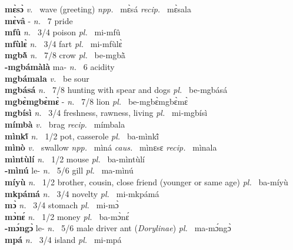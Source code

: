 {\bfseries mɛ̀sɔ̀}  {\itshape v.~} wave (greeting)   {\itshape npp.~} mɛ̀sá {\itshape recip.~} mɛ̀sala  \\ 
{\bfseries mɛ̀vâ} - {\itshape n.~} 7 pride    \\ 
{\bfseries mfû}  {\itshape n.~} 3/4 poison {\itshape pl.~} mi-mfû    \\ 
{\bfseries mfùlɛ̀}  {\itshape n.~} 3/4 fart {\itshape pl.~} mi-mfùlɛ̀    \\ 
{\bfseries mgbã̀}  {\itshape n.~} 7/8 crow {\itshape pl.~} be-mgbã̀    \\ 
{\bfseries -mgbámàlà} ma- {\itshape n.~} 6 acidity    \\ 
{\bfseries mgbámala}  {\itshape v.~} be sour    \\ 
{\bfseries mgbásá}  {\itshape n.~} 7/8 hunting with spear and dogs {\itshape pl.~} be-mgbásá    \\ 
{\bfseries mgbɛ̀mgbɛ̀mɛ̀} - {\itshape n.~} 7/8 lion  {\itshape pl.~} be-mgbɛ̀mgbɛ̀mɛ̀    \\ 
{\bfseries mgbísì}  {\itshape n.~} 3/4 freshness, rawness, living {\itshape pl.~} mi-mgbísì    \\ 
{\bfseries mímbà}  {\itshape v.~} brag   {\itshape recip.~} mímbala  \\ 
{\bfseries mìnkĩ́}  {\itshape n.~} 1/2 pot, casserole {\itshape pl.~} ba-mìnkĩ́    \\ 
{\bfseries mìnò}  {\itshape v.~} swallow   {\itshape npp.~} mìná {\itshape caus.~} mìnɛsɛ {\itshape recip.~} mìnala  \\ 
{\bfseries mìntùlí}  {\itshape n.~} 1/2 mouse {\itshape pl.~} ba-mìntùlí    \\ 
{\bfseries -mìnú} le- {\itshape n.~} 5/6 gill {\itshape pl.~} ma-mìnú    \\ 
{\bfseries míyù}  {\itshape n.~} 1/2 brother, cousin, close friend (younger or same age) {\itshape pl.~} ba-míyù \\ 
{\bfseries mkpámá}  {\itshape n.~} 3/4 novelty {\itshape pl.~} mi-mkpámá    \\ 
{\bfseries mɔ̀}  {\itshape n.~} 3/4 stomach {\itshape pl.~} mi-mɔ̀    \\ 
{\bfseries mɔ̀nɛ́}  {\itshape n.~} 1/2 money {\itshape pl.~} ba-mɔ̀nɛ́    \\ 
{\bfseries -mɔ́ngɔ̀} le- {\itshape n.~} 5/6 male driver ant ({\itshape Dorylinae}) {\itshape pl.~} ma-mɔ́ngɔ̀    \\ 
{\bfseries mpá}  {\itshape n.~} 3/4 island {\itshape pl.~} mi-mpá    \\ 

